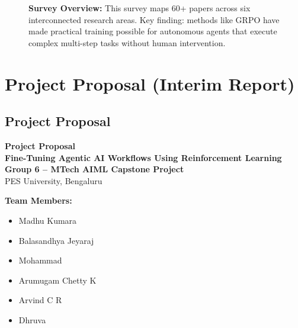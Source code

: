 \documentclass[12pt,a4paper]{report}
\theoremstyle{definition}
\begin{document}
\begin{figure}[htbp]
\caption*{\textbf{Survey Overview:} This survey maps 60+ papers across six interconnected research areas. Key finding: methods like GRPO have made practical training possible for autonomous agents that execute complex multi-step tasks without human intervention.
}
\end{figure}

\tableofcontents

\cleardoublepage{}
{}
\listoffigures

\cleardoublepage{}
{}
\listoftables



\tableofcontents

\listoftables

\listoffigures

\clearpage


\part{Project Proposal (Interim Report)}

\chapter*{Project Proposal}


\begin{center}
\textbf{\Large Project Proposal}\\[0.3cm]
\textbf{\large Fine-Tuning Agentic AI Workflows Using Reinforcement Learning}\\[0.5cm]
\textbf{Group 6 -- MTech AIML Capstone Project}\\[0.3cm]
PES University, Bengaluru\\[0.5cm]
\end{center}

\noindent\textbf{Team Members:}
\begin{itemize}
    \item Madhu Kumara
    \item Balasandhya Jeyaraj
    \item Mohammad
    \item Arumugam Chetty K
    \item Arvind C R
    \item Dhruva
\end{itemize}
\end{document}
